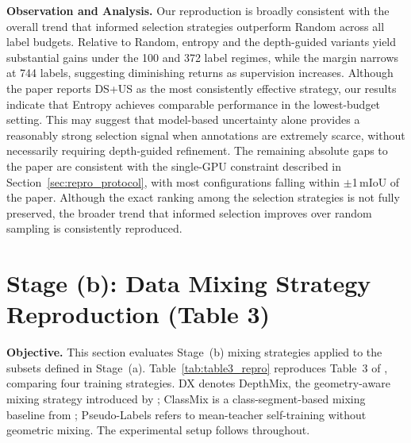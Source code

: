 \noindent
\textbf{Observation and Analysis.}
Our reproduction is broadly consistent with the overall trend that informed
selection strategies outperform Random across all label budgets. Relative
to Random, entropy and the depth-guided variants yield substantial gains
under the 100 and 372 label regimes, while the margin narrows at 744
labels, suggesting diminishing returns as supervision increases.
Although the paper reports DS+US as the most consistently effective
strategy, our results indicate that Entropy achieves comparable
performance in the lowest-budget setting. This may suggest that
model-based uncertainty alone provides a reasonably strong selection
signal when annotations are extremely scarce, without necessarily
requiring depth-guided refinement. The remaining absolute gaps to the
paper are consistent with the single-GPU constraint described in
Section~\ref{sec:repro_protocol}, with most configurations falling within
$\pm$1\,mIoU of the paper. Although the exact ranking among the selection
strategies is not fully preserved, the broader trend that informed
selection improves over random sampling is consistently reproduced.

\clearpage
\section{Stage (b): Data Mixing Strategy Reproduction (Table 3)}
\label{sec:stage_ab_table3}

\noindent
\textbf{Objective.} This section evaluates Stage~(b) mixing strategies
applied to the subsets defined in Stage~(a).
Table~\ref{tab:table3_repro} reproduces Table~3 of
\cite{hoyer2023improving}, comparing four training strategies. DX denotes
DepthMix, the geometry-aware mixing strategy introduced by
\cite{hoyer2023improving}; ClassMix is a class-segment-based mixing
baseline from \cite{olsson2021classmix}; Pseudo-Labels refers to
mean-teacher self-training without geometric mixing. The experimental
setup follows \cite{hoyer2023improving} throughout.

